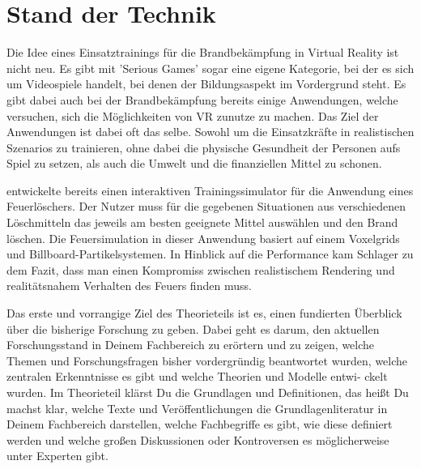 \section{Stand der Technik}

Die Idee eines Einsatztrainings für die Brandbekämpfung in Virtual Reality ist nicht neu. Es gibt mit 
'Serious Games' sogar eine eigene Kategorie, bei der es sich um Videospiele handelt, bei denen der 
Bildungsaspekt im Vordergrund steht. 
Es gibt dabei auch bei der Brandbekämpfung bereits einige Anwendungen, welche versuchen, 
sich die Möglichkeiten von VR zunutze zu machen.
Das Ziel der Anwendungen ist dabei oft das selbe. Sowohl um die Einsatzkräfte in realistischen Szenarios 
zu trainieren, ohne dabei die physische Gesundheit der Personen aufs Spiel zu setzen, als auch die 
Umwelt und die finanziellen Mittel zu schonen.



\parencite{Schlager2017} entwickelte bereits einen interaktiven Trainingssimulator für die Anwendung 
eines Feuerlöschers. Der Nutzer muss für die gegebenen Situationen aus verschiedenen Löschmitteln das 
jeweils am besten geeignete Mittel auswählen und den Brand löschen. Die Feuersimulation in dieser 
Anwendung basiert auf einem Voxelgrids und Billboard-Partikelsystemen. In Hinblick auf die Performance kam Schlager
zu dem Fazit, dass man einen Kompromiss zwischen realistischem Rendering und realitätsnahem Verhalten 
des Feuers finden muss. 


Das erste und vorrangige Ziel des Theorieteils ist es, einen fundierten Überblick über die bisherige Forschung zu geben. Dabei geht es darum, den aktuellen Forschungsstand in Deinem Fachbereich zu erörtern und zu zeigen, welche Themen und Forschungsfragen bisher vordergründig beantwortet wurden, welche zentralen Erkenntnisse es gibt und welche Theorien und Modelle entwi- ckelt wurden. Im Theorieteil klärst Du die Grundlagen und Definitionen, das heißt Du machst klar, welche Texte und Veröffentlichungen die Grundlagenliteratur in Deinem Fachbereich darstellen, welche Fachbegriffe es gibt, wie diese definiert werden und welche großen Diskussionen oder Kontroversen es möglicherweise unter Experten gibt.


